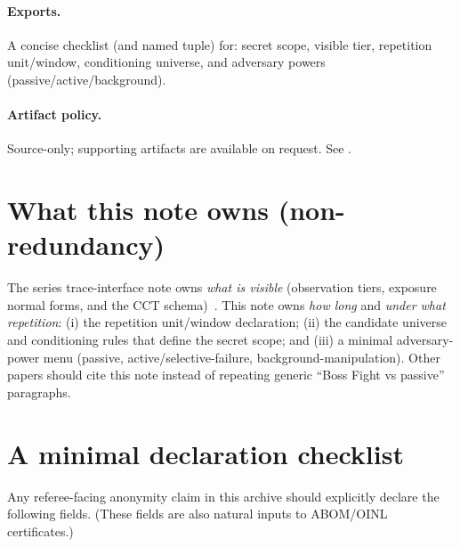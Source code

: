 \documentclass[11pt]{article}
\begin{document}
\paragraph{Exports.}
A concise checklist (and named tuple) for: secret scope, visible tier, repetition unit/window, conditioning universe, and adversary powers (passive/active/background).

\paragraph{Artifact policy.}
Source-only; supporting artifacts are available on request. See \cite{series:artifactpolicy}.

\section{What this note owns (non-redundancy)}
The series trace-interface note owns \emph{what is visible} (observation tiers, exposure normal forms, and the CCT schema)~\cite{series:traceifaces}.
This note owns \emph{how long} and \emph{under what repetition}:
(i) the repetition unit/window declaration; (ii) the candidate universe and conditioning rules that define the secret scope; and (iii) a minimal adversary-power menu (passive, active/selective-failure, background-manipulation).
Other papers should cite this note instead of repeating generic ``Boss Fight vs passive'' paragraphs.

\section{A minimal declaration checklist}\label{sec:checklist}
Any referee-facing anonymity claim in this archive should explicitly declare the following fields.
(These fields are also natural inputs to ABOM/OINL certificates.)
\end{document}
